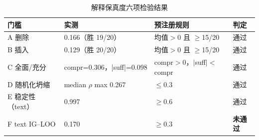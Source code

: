 \begin{table}[htbp]
  \centering\small
\caption{解释保真度六项检验结果}
  \label{tab:p3-fidelity}
  \begin{tabularx}{\linewidth}{@{}p{2.2cm}p{5.2cm}p{3.9cm}X@{}}
    \toprule
    门槛 & 实测 & 预注册规则 & 判定 \\
    \midrule
    A 删除 & 0.166（胜 19/20） & 均值$>$0 且 $\ge$15/20 & 通过 \\
    B 插入 & 0.129（胜 20/20） & 均值$>$0 且 $\ge$15/20 & 通过 \\
    C 全面/充分 & compr=0.306，|suff|=0.098 & compr$>$0，$|$suff$|<$compr & 通过 \\
    D 随机化坍缩 & median $\rho$ max 0.267 & $\le 0.3$ & 通过 \\
    E 稳定性（text） & 0.997 & $\ge 0.6$ & 通过 \\
    F text IG--LOO & 0.170 & $\ge 0.3$ & \textbf{未通过} \\
    \bottomrule
  \end{tabularx}
  \par \smallskip
  \end{table}